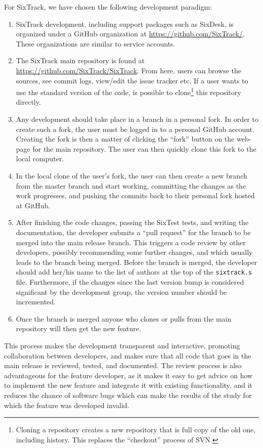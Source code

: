 \documentclass[english,BCOR=0mm,DIV=18]{scrartcl}
\begin{document}
For SixTrack, we have chosen the following development paradigm:
\begin{enumerate}
\item SixTrack development, including support packages such as SixDesk, is organized under a GitHub organization at \url{https://github.com/SixTrack/}.
      These organizations are similar to service accounts.
\item The SixTrack main repository is found at \url{https://github.com/SixTrack/SixTrack}.
      From here, users can browse the sources, see commit logs, view/edit the issue tracker etc.
      If a user wants to use the standard version of the code, is possible to clone\footnote{Cloning a repository creates a new repository that is full copy of the old one, including history. This replaces the ``checkout'' process of SVN.} this repository directly.
\item Any development should take place in a branch in a personal fork.
      In order to create such a fork, the user must be logged in to a personal GitHub account.
      Creating the fork is then a matter of clicking the ``fork'' button on the web-page for the main repository.
      The user can then quickly clone this fork to the local computer.
\item In the local clone of the user's fork, the user can then create a new branch from the master branch and start working, committing the changes as the work progresses, and pushing the commits back to their personal fork hosted at GitHub.
\item After finishing the code changes, passing the SixTest tests, and writing the documentation, the developer submits a ``pull request'' for the branch to be merged into the main release branch.
      This triggers a code review by other developers, possibly recommending some further changes, and which usually leads to the branch being merged.
      Before the branch is merged, the developer should add her/his name to the list of authors at the top of the \texttt{sixtrack.s} file.
      Furthermore, if the changes since the last version bump is considered significant by the development group, the version number should be incremented.
\item Once the branch is merged anyone who clones or pulls from the main repository will then get the new feature.
\end{enumerate}
This process makes the development transparent and interactive, promoting collaboration between developers, and makes sure that all code that goes in the main release is reviewed, tested, and documented.
The review process is also advantageous for the feature developer, as it makes it easy to get advice on how to implement the new feature and integrate it with existing functionality, and it reduces the chance of software bugs which can make the results of the study for which the feature was developed invalid.
\end{document}
